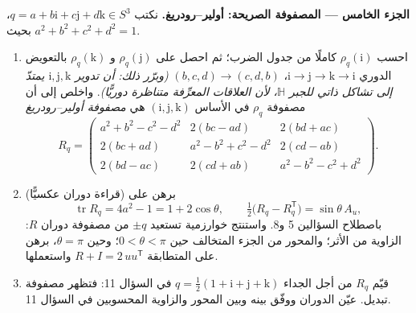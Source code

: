 \begin{problem}
\medskip
\noindent\textbf{الجزء الخامس --- المصفوفة الصريحة:
أولير--رودريغ.} نكتب $q = a + b\mathrm i + c\mathrm j +
d\mathrm k \in S^3$، بحيث $a^2 + b^2 + c^2 + d^2 = 1$.
\begin{enumerate}[resume]
  \item احسب $\rho_q(\mathrm i)$ كاملًا من جدول الضرب؛ ثم احصل على $\rho_q(\mathrm
        j)$
        و $\rho_q(\mathrm k)$ بالتعويض الدوري $\mathrm i \to \mathrm j \to \mathrm k
        \to \mathrm i$، $(b, c, d) \to (c, d, b)$ \emph{(وبرّر
        ذلك: أن تدوير $\mathrm i, \mathrm j,
        \mathrm k$ يمتدّ إلى تشاكل ذاتي للجبر
        $\mathbb
        H$، لأن العلاقات المعرِّفة متناظرة دوريًّا)}.
        واخلص إلى أن مصفوفة $\rho_q$ في الأساس $(\mathrm i, \mathrm j, \mathrm k)$ هي
        \emph{مصفوفة أولير--رودريغ}
        \[
        R_q = \begin{pmatrix}
        a^2 + b^2 - c^2 - d^2 & 2(bc - ad) & 2(bd + ac)\\
        2(bc + ad) & a^2 - b^2 + c^2 - d^2 & 2(cd - ab)\\
        2(bd - ac) & 2(cd + ab) & a^2 - b^2 - c^2 + d^2
        \end{pmatrix}.
        \]
  \item (قراءة دوران عكسيًّا) برهن على
        \[
        \operatorname{tr}R_q = 4a^2 - 1 = 1 + 2\cos\theta,
        \qquad
        \tfrac12\bigl(R_q - R_q^{\mathsf T}\bigr) =
        \sin\theta\,A_u,
        \]
        باصطلاح السؤالين 5 و8. واستنتج خوارزمية تستعيد $\pm q$
        من مصفوفة دوران $R$: الزاوية من الأثر؛ والمحور من
        الجزء المتخالف حين $0 < \theta < \pi$؛ وحين $\theta = \pi$،
        برهن على المتطابقة $R
        + I = 2\,uu^{\mathsf T}$ واستعملها.
  \item قيّم $R_q$ من أجل الجداء $q =
        \frac12(1 + \mathrm i + \mathrm j + \mathrm k)$ في السؤال 11: فتظهر
        مصفوفة تبديل. عيّن الدوران ووفّق بينه وبين المحور
        والزاوية المحسوبين في السؤال 11.
\end{enumerate}


\end{problem}
